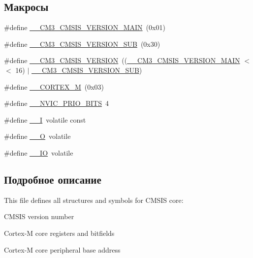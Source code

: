 \subsection*{Макросы}
\begin{DoxyCompactItemize}
\item 
\#define \mbox{\hyperlink{group___c_m_s_i_s___c_m3__core__definitions_gac1c1120e9fe082fac8225c60143ac79a}{\+\_\+\+\_\+\+C\+M3\+\_\+\+C\+M\+S\+I\+S\+\_\+\+V\+E\+R\+S\+I\+O\+N\+\_\+\+M\+A\+IN}}~(0x01)
\item 
\#define \mbox{\hyperlink{group___c_m_s_i_s___c_m3__core__definitions_ga9ff7a998d4b8b3c87bfaca6e78607950}{\+\_\+\+\_\+\+C\+M3\+\_\+\+C\+M\+S\+I\+S\+\_\+\+V\+E\+R\+S\+I\+O\+N\+\_\+\+S\+UB}}~(0x30)
\item 
\#define \mbox{\hyperlink{group___c_m_s_i_s___c_m3__core__definitions_gaf888c651cd8c93fd25364f9e74306a1c}{\+\_\+\+\_\+\+C\+M3\+\_\+\+C\+M\+S\+I\+S\+\_\+\+V\+E\+R\+S\+I\+ON}}~((\mbox{\hyperlink{group___c_m_s_i_s___c_m3__core__definitions_gac1c1120e9fe082fac8225c60143ac79a}{\+\_\+\+\_\+\+C\+M3\+\_\+\+C\+M\+S\+I\+S\+\_\+\+V\+E\+R\+S\+I\+O\+N\+\_\+\+M\+A\+IN}} $<$$<$ 16) $\vert$ \mbox{\hyperlink{group___c_m_s_i_s___c_m3__core__definitions_ga9ff7a998d4b8b3c87bfaca6e78607950}{\+\_\+\+\_\+\+C\+M3\+\_\+\+C\+M\+S\+I\+S\+\_\+\+V\+E\+R\+S\+I\+O\+N\+\_\+\+S\+UB}})
\item 
\#define \mbox{\hyperlink{group___c_m_s_i_s___c_m3__core__definitions_ga63ea62503c88acab19fcf3d5743009e3}{\+\_\+\+\_\+\+C\+O\+R\+T\+E\+X\+\_\+M}}~(0x03)
\item 
\#define \mbox{\hyperlink{group___c_m_s_i_s___c_m3__core__definitions_gae3fe3587d5100c787e02102ce3944460}{\+\_\+\+\_\+\+N\+V\+I\+C\+\_\+\+P\+R\+I\+O\+\_\+\+B\+I\+TS}}~4
\item 
\#define \mbox{\hyperlink{group___c_m_s_i_s___c_m3__core__definitions_gaf63697ed9952cc71e1225efe205f6cd3}{\+\_\+\+\_\+I}}~volatile const
\item 
\#define \mbox{\hyperlink{group___c_m_s_i_s___c_m3__core__definitions_ga7e25d9380f9ef903923964322e71f2f6}{\+\_\+\+\_\+O}}~volatile
\item 
\#define \mbox{\hyperlink{group___c_m_s_i_s___c_m3__core__definitions_gaec43007d9998a0a0e01faede4133d6be}{\+\_\+\+\_\+\+IO}}~volatile
\end{DoxyCompactItemize}


\subsection{Подробное описание}
This file defines all structures and symbols for C\+M\+S\+IS core\+:
\begin{DoxyItemize}
\item C\+M\+S\+IS version number
\item Cortex-\/M core registers and bitfields
\item Cortex-\/M core peripheral base address 
\end{DoxyItemize}

